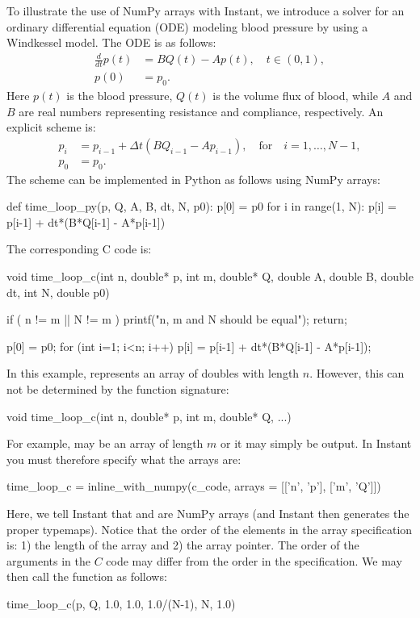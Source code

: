 To illustrate the use of NumPy arrays with Instant, we introduce a
solver for an ordinary differential equation (ODE) modeling blood
pressure by using a Windkessel model. The ODE
is as follows:
\begin{align}
\frac{d}{dt}p(t) &= B Q(t) - A p(t), \quad t \in (0,1), \\
p(0) &= p_0.
\end{align}
Here $p(t)$ is the blood pressure, $Q(t)$ is the volume flux of blood,
while $A$ and $B$ are real numbers representing resistance and compliance, respectively.
An explicit scheme is:
\begin{align}
p_i &= p_{i-1} + \Delta t (B Q_{i-1} - A p_{i-1}), \quad \mbox{for}\quad i=1,\ldots,N-1, \\
p_0 &= p_0.
\end{align}
The scheme can be implemented in Python as follows using NumPy arrays:
\begin{python}
def time_loop_py(p, Q, A, B, dt, N, p0):
    p[0] = p0
    for i in range(1, N):
        p[i] = p[i-1] + dt*(B*Q[i-1] - A*p[i-1])
\end{python}
The corresponding C code is:
\begin{c++}
void time_loop_c(int n, double* p,
                 int m, double* Q,
                 double A, double B,
                 double dt, int N, double p0)
{
    if ( n != m || N != m )
    {
        printf("n, m and N should be equal\n");
        return;
    }

    p[0] = p0;
    for (int i=1; i<n; i++)
    {
        p[i] = p[i-1] + dt*(B*Q[i-1] - A*p[i-1]);
    }
}
\end{c++}
In this example,  represents an array of
doubles with length $n$. However, this can not be determined by the
function signature:
\begin{c++}
void time_loop_c(int n, double* p, int m, double* Q, ...)
\end{c++}
For example,  may be an array of length $m$ or it may simply be
output. In Instant you must therefore specify what the arrays are:
\begin{python}
time_loop_c = inline_with_numpy(c_code,
                                arrays = [['n', 'p'],
                                          ['m', 'Q']])
\end{python}
Here, we tell Instant that  and
 are NumPy arrays (and Instant then generates the
proper typemaps). Notice that the order of the elements in the array specification is: 1) the length of the array and 2) the array pointer. The order
of the arguments in the $C$ code may differ from the order in the  specification.   
We may then call the 
function as follows:
\begin{python}
time_loop_c(p, Q, 1.0, 1.0, 1.0/(N-1), N, 1.0)
\end{python}

